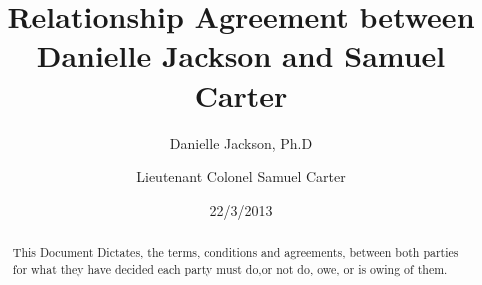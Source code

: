 






\title{Relationship Agreement between Danielle Jackson and Samuel Carter}
\author{ Danielle Jackson, Ph.D \and Lieutenant Colonel Samuel Carter }
\date{22/3/2013}
\maketitle
 \begin{abstract}
This Document Dictates, the terms, conditions and agreements, between both parties for what they have decided  
each party must do,or not do, owe, or is owing of them.
 \end{abstract}


